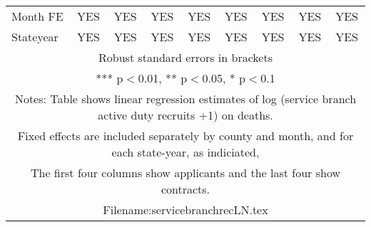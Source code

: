 \documentclass[]{article}
\begin{document}
\begin{tabular}{lcccccccc}
Month FE & YES & YES & YES & YES & YES & YES & YES & YES \\
 Stateyear & YES & YES & YES & YES & YES & YES & YES & YES \\ \hline
\multicolumn{9}{c}{ Robust standard errors in brackets} \\
\multicolumn{9}{c}{ *** p$<$0.01, ** p$<$0.05, * p$<$0.1} \\
\multicolumn{9}{c}{ Notes: Table shows linear regression estimates of log (service branch active duty recruits +1) on deaths.} \\
\multicolumn{9}{c}{ Fixed effects are included separately by county and month, and for each state-year, as indiciated,} \\
\multicolumn{9}{c}{ The first four columns show applicants and the last four show contracts.} \\
\multicolumn{9}{c}{ Filename:servicebranchrecLN.tex} \\
\end{tabular}
\end{document}
